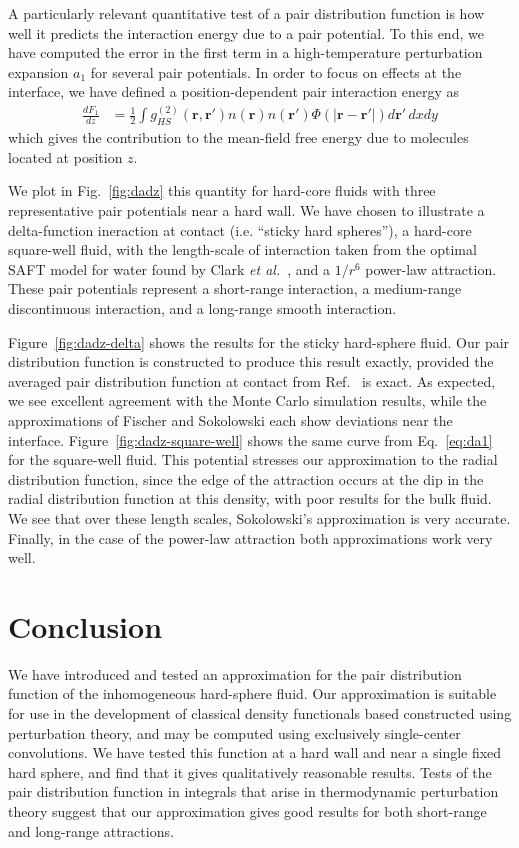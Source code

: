 \documentclass[letterpaper,twocolumn,amsmath,amssymb,pre,aps,10pt]{revtex4-1}
\newcommand{\rr}{\textbf{r}}
\begin{document}
A particularly relevant quantitative test of a pair distribution
function is how well it predicts the interaction energy due to a pair
potential.  To this end, we have computed the error in the first term
in a high-temperature perturbation expansion $a_1$ for several pair
potentials.  In order to focus on effects at the interface, we have
defined a position-dependent pair interaction energy as
\begin{align}
  \frac{dF_1}{dz} &=
  \tfrac12 \int g^{(2)}_{HS}(\rr,\rr')n(\rr)n(\rr')\Phi(|\rr-\rr'|)
  d\rr'\, dxdy\label{eq:da1}
\end{align}
which gives the contribution to the mean-field free energy due to
molecules located at position $z$.

We plot in Fig.~\ref{fig:dadz} this quantity for hard-core fluids with
three representative pair potentials near a hard wall.  We have chosen
to illustrate a delta-function ineraction at contact (i.e. ``sticky
hard spheres''), a hard-core square-well fluid, with the length-scale
of interaction taken from the optimal SAFT model for water found by
Clark \emph{et al.}~\cite{clark2006developing}, and a $1/r^6$
power-law attraction.  These pair potentials represent a short-range
interaction, a medium-range discontinuous interaction, and a
long-range smooth interaction.

Figure~\ref{fig:dadz-delta} shows the results for the sticky
hard-sphere fluid.  Our pair distribution function is constructed to
produce this result exactly, provided the averaged pair distribution
function at contact from Ref.~ is exact.  As
expected, we see excellent agreement with the Monte Carlo simulation
results, while the approximations of Fischer and Sokolowski each show
deviations near the interface.  Figure~\ref{fig:dadz-square-well}
shows the same curve from Eq.~\ref{eq:da1} for the square-well fluid.
This potential stresses our approximation to the radial distribution
function, since the edge of the attraction occurs at the dip in the
radial distribution function at this density, with poor results for
the bulk fluid.  We see that over these length scales, Sokolowski's
approximation is very accurate.  Finally, in the case of the power-law
attraction both approximations work very well.

\section{Conclusion}

We have introduced and tested an approximation for the pair
distribution function of the inhomogeneous hard-sphere fluid.  Our
approximation is suitable for use in the development of classical
density functionals based constructed using perturbation theory, and
may be computed using exclusively single-center convolutions.  We have
tested this function at a hard wall and near a single fixed hard
sphere, and find that it gives qualitatively reasonable results.
Tests of the pair distribution function in integrals that arise in
thermodynamic perturbation theory suggest that our approximation gives
good results for both short-range and long-range attractions.

\end{document}
